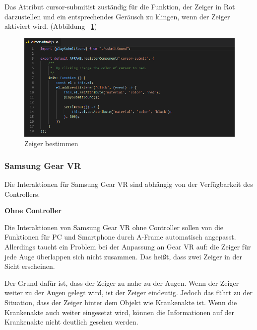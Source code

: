   Das Attribut \glqq cursor-submit\grqq ist zuständig für die Funktion, der Zeiger in Rot darzustellen und ein entsprechendes Geräusch zu klingen, wenn der Zeiger aktiviert wird. (Abbildung ~\ref{fig:cursorSubmit})
  
\begin{figure}[ht]
\vspace*{0.3cm}
\centering
\includegraphics[width=\textwidth]{images/cursorSubmit.png}
\caption[Zeiger bestimmen]{Zeiger bestimmen}
\label{fig:cursorSubmit} 
\end{figure}
  
  \subsubsection{Samsung Gear VR}
  Die Interaktionen für Samsung Gear VR sind abhängig von der Verfügbarkeit des Controllers.
  
  \textbf{Ohne Controller}
  
  Die Interaktionen von Samsung Gear VR ohne Controller sollen von die Funktionen für PC und Smartphone durch A-Frame automatisch angepasst. Allerdings taucht ein Problem bei der Anpassung an Gear VR auf: die Zeiger für jede Auge überlappen sich nicht zusammen. Das heißt, dass zwei Zeiger in der Sicht erscheinen.
  
  Der Grund dafür ist, dass der Zeiger zu nahe zu der Augen. Wenn der Zeiger weiter zu der Augen gelegt wird, ist der Zeiger eindeutig. Jedoch das führt zu der Situation, dass der Zeiger hinter dem Objekt wie Krankenakte ist. Wenn die Krankenakte auch weiter eingesetzt wird, können die Informationen auf der Krankenakte nicht deutlich gesehen werden.
  
